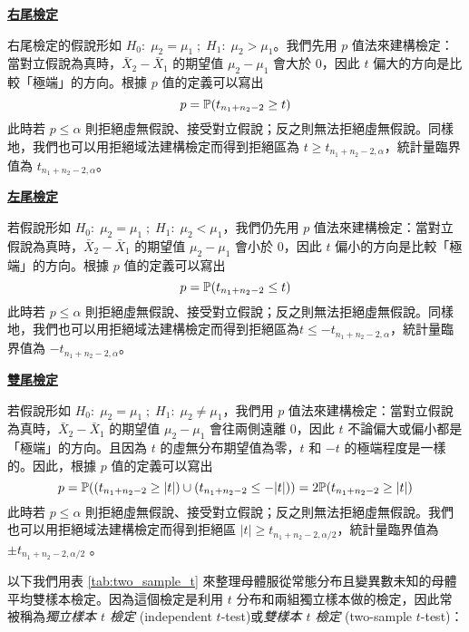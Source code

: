     \noindent\underline{\textbf{右尾檢定}}

    右尾檢定的假說形如 $H_0: \; \mu_2 = \mu_1 \; ; \; H_1: \; \mu_2 > \mu_1$。我們先用 $p$ 值法來建構檢定：當對立假說為真時，$\bar{X}_2 - \bar{X}_1$ 的期望值 $\mu_2 - \mu_1$ 會大於 0，因此 $t$ 偏大的方向是比較「極端」的方向。根據 $p$ 值的定義可以寫出
    \[p = \mathbb{P}(t_{n_1+n_2-2} \ge t)\]
    此時若 $p \le \alpha$ 則拒絕虛無假說、接受對立假說；反之則無法拒絕虛無假說。同樣地，我們也可以用拒絕域法建構檢定而得到拒絕區為 $t \ge t_{n_1+n_2-2,\alpha}$，統計量臨界值為 $t_{n_1+n_2-2,\alpha}$。

    \noindent\underline{\textbf{左尾檢定}}

    若假說形如 $H_0: \; \mu_2 = \mu_1 \; ; \; H_1: \; \mu_2 < \mu_1$，我們仍先用 $p$ 值法來建構檢定：當對立假說為真時，$\bar{X}_2 - \bar{X}_1$ 的期望值 $\mu_2 - \mu_1$ 會小於 0，因此 $t$ 偏小的方向是比較「極端」的方向。根據 $p$ 值的定義可以寫出
    \[p = \mathbb{P}(t_{n_1+n_2-2} \le t)\]
    此時若 $p \le \alpha$ 則拒絕虛無假說、接受對立假說；反之則無法拒絕虛無假說。同樣地，我們也可以用拒絕域法建構檢定而得到拒絕區為$t \le -t_{n_1+n_2-2,\alpha}$，統計量臨界值為 $-t_{n_1+n_2-2,\alpha}$。

    \noindent\underline{\textbf{雙尾檢定}}

    若假說形如 $H_0: \; \mu_2 = \mu_1 \; ; \; H_1: \; \mu_2 \ne \mu_1$，我們用 $p$ 值法來建構檢定：當對立假說為真時，$\bar{X}_2 - \bar{X}_1$ 的期望值 $\mu_2 - \mu_1$ 會往兩側遠離 0，因此 $t$ 不論偏大或偏小都是「極端」的方向。且因為 $t$ 的虛無分布期望值為零，$t$ 和 $-t$ 的極端程度是一樣的。因此，根據 $p$ 值的定義可以寫出
    \[p = \mathbb{P}((t_{n_1+n_2-2} \ge |t|)\cup(t_{n_1+n_2-2} \le -|t|)) = 2\mathbb{P}(t_{n_1+n_2-2} \ge |t|)\]
    此時若 $p \le \alpha$ 則拒絕虛無假說、接受對立假說；反之則無法拒絕虛無假說。我們也可以用拒絕域法建構檢定而得到拒絕區 $|t| \ge t_{n_1+n_2-2,\alpha/2}$，統計量臨界值為 $\pm t_{n_1+n_2-2,\alpha/2}$ 。
    
    以下我們用表 \ref{tab:two_sample_t} 來整理母體服從常態分布且變異數未知的母體平均雙樣本檢定。因為這個檢定是利用 $t$ 分布和兩組獨立樣本做的檢定，因此常被稱為\textit{獨立樣本 $t$ 檢定} (independent $t$-test)或\textit{雙樣本 $t$ 檢定} (two-sample $t$-test)：

